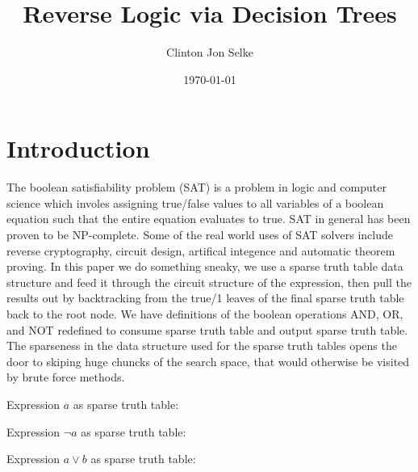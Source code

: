 \documentclass[a4paper,12pt]{article}
\begin{document}
\title{Reverse Logic via Decision Trees}
\author{Clinton Jon Selke}
\date{\today}
\maketitle

\tableofcontents
\newpage
{}

\section{Introduction}
The boolean satisfiability problem (SAT) is a problem in logic and computer science which involes assigning true/false values to all variables of a boolean equation such that the entire equation evaluates to true. SAT in general has been proven to be NP-complete. Some of the real world uses of SAT solvers include reverse cryptography, circuit design, artifical integence and automatic theorem proving. In this paper we do something sneaky, we use a sparse truth table data structure and feed it through the circuit structure of the expression, then pull the results out by backtracking from the true/1 leaves of the final sparse truth table back to the root node. We have definitions of the boolean operations AND, OR, and NOT redefined to consume sparse truth table and output sparse truth table. The sparseness in the data structure used for the sparse truth tables opens the door to skiping huge chuncks of the search space, that would otherwise be visited by brute force methods.

Expression $a$ as sparse truth table:


Expression $\neg a$ as sparse truth table:


Expression $a \vee b$ as sparse truth table:
\end{document}
